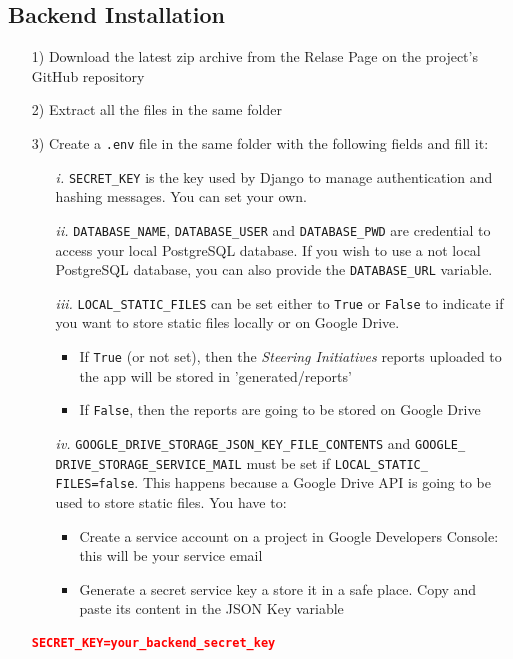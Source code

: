 \documentclass[table, 12pt]{article}
\begin{document}
\subsection{Backend Installation}
\begin{itemize}
    \item[1)] Download the latest zip archive from the Relase Page on the project's GitHub repository
    \item[2)] Extract all the files in the same folder
    \item[3)] Create a \texttt{.env} file in the same folder with the following fields and fill it:
    \begin{itemize}
        \item[\textit{i.}] \texttt{SECRET\_KEY} is the key used by Django to manage authentication and hashing messages. You can set your own.
        \item[\textit{ii.}] \texttt{DATABASE\_NAME}, \texttt{DATABASE\_USER} and \texttt{DATABASE\_PWD} are credential to access your local PostgreSQL database. If you wish to use a not local PostgreSQL database, you can also provide the \texttt{DATABASE\_URL} variable.
        \item[\textit{iii.}] \texttt{LOCAL\_STATIC\_FILES} can be set either to \texttt{True} or \texttt{False} to indicate if you want to store static files locally or on Google Drive.
        \begin{itemize}
            \item If \texttt{True} (or not set), then the \emph{Steering Initiatives} reports uploaded to the app will be stored in 'generated/reports'
            \item If \texttt{False}, then the reports are going to be stored on Google Drive
        \end{itemize} 
        \item[\textit{iv.}] \texttt{GOOGLE\_DRIVE\_STORAGE\_JSON\_KEY\_FILE\_CONTENTS} and \texttt{GOOGLE\_\\DRIVE\_STORAGE\_SERVICE\_MAIL} must be set if \texttt{LOCAL\_STATIC\_\\FILES=false}. This happens because a Google Drive API is going to be used to store static files. You have to:
        \begin{itemize}
            \item Create a service account on a project in Google Developers Console: this will be your service email
            \item Generate a secret service key a store it in a safe place. Copy and paste its content in the JSON Key variable
        \end{itemize}      
    \end{itemize}
    \begin{lstlisting}[language=json]
SECRET_KEY=your_backend_secret_key


\end{lstlisting}
\end{itemize}
\end{document}

